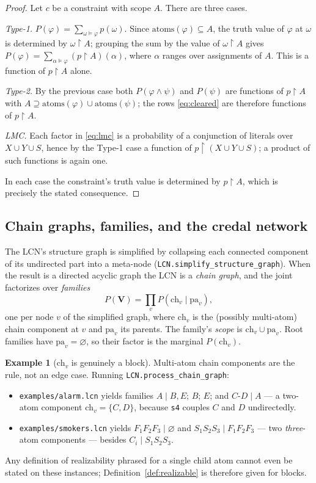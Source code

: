 \documentclass[11pt]{article}
\theoremstyle{definition}
\newtheorem{example}{Example}
\newcommand{\ch}{\mathrm{ch}}
\newcommand{\pa}{\mathrm{pa}}
\newcommand{\atoms}{\mathrm{atoms}}
\newcommand{\restr}{\!\restriction\!}
\begin{document}
\begin{proof}
Let $c$ be a constraint with scope $A$. There are three cases.

\emph{Type-1.} $P(\varphi)=\sum_{\omega\models\varphi}p(\omega)$. Since
$\atoms(\varphi)\subseteq A$, the truth value of $\varphi$ at $\omega$ is determined by
$\omega\restr A$; grouping the sum by the value of $\omega\restr A$ gives
$P(\varphi)=\sum_{\alpha\models\varphi}(p\restr A)(\alpha)$, where $\alpha$ ranges over assignments
of $A$. This is a function of $p\restr A$ alone.

\emph{Type-2.} By the previous case both $P(\varphi\wedge\psi)$ and $P(\psi)$ are functions of
$p\restr A$ with $A\supseteq\atoms(\varphi)\cup\atoms(\psi)$; the rows \eqref{eq:cleared} are
therefore functions of $p\restr A$.

\emph{LMC.} Each factor in \eqref{eq:lmc} is a probability of a conjunction of literals over
$X\cup Y\cup S$, hence by the Type-1 case a function of $p\restr(X\cup Y\cup S)$; a product of such
functions is again one.

In each case the constraint's truth value is determined by $p\restr A$, which is precisely the
stated consequence.
\end{proof}

\subsection{Chain graphs, families, and the credal network}
The LCN's structure graph is simplified by collapsing each connected component of its undirected
part into a meta-node (\texttt{LCN.simplify\_structure\_graph}). When the result is a directed
acyclic graph the LCN is a \emph{chain graph}, and the joint factorizes over \emph{families}
\begin{equation}\label{eq:factor}
  P(\mathbf V)=\prod_v P(\ch_v\mid\pa_v),
\end{equation}
one per node $v$ of the simplified graph, where $\ch_v$ is the (possibly multi-atom) chain component
at $v$ and $\pa_v$ its parents. The family's \emph{scope} is $\ch_v\cup\pa_v$. Root families have
$\pa_v=\varnothing$, so their factor is the marginal $P(\ch_v)$.

\begin{example}[$\ch_v$ is genuinely a block]\label{ex:blocks}
Multi-atom chain components are the rule, not an edge case. Running
\texttt{LCN.process\_chain\_graph}:
\begin{itemize}\itemsep1pt
  \item \texttt{examples/alarm.lcn} yields families $A\mid B,E$; $B$; $E$; and
    $\boxed{C\text{-}D\mid A}$ --- a two-atom component $\ch_v=\{C,D\}$, because \texttt{s4}
    couples $C$ and $D$ undirectedly.
  \item \texttt{examples/smokers.lcn} yields $\boxed{F_1F_2F_3\mid\varnothing}$ and
    $\boxed{S_1S_2S_3\mid F_1F_2F_3}$ --- two \emph{three}-atom components --- besides
    $C_i\mid S_1S_2S_3$.
\end{itemize}
Any definition of realizability phrased for a single child atom cannot even be stated on these
instances; Definition~\ref{def:realizable} is therefore given for blocks.
\end{example}
\end{document}
